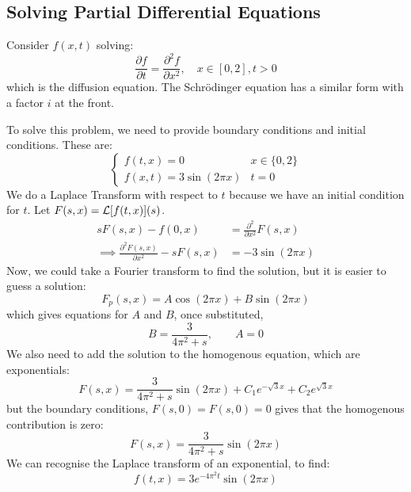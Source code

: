 \documentclass[../Main.tex]{subfiles}
\begin{document}
\subsection{Solving Partial Differential Equations}
\begin{example}
    Consider $f(x, t)$ solving:
    \begin{equation*}
        \frac{\partial f}{\partial t} = \frac{\partial^{2}f}{\partial x^{2}},\quad x \in [0, 2], t > 0
    \end{equation*}
    which is the diffusion equation. The Schr\"odinger equation has a similar form with a factor $i$ at the front.

    To solve this problem, we need to provide boundary conditions and initial conditions. These are:
    \begin{equation*}
        \begin{cases}
            f(t, x) = 0 & x \in \{0, 2\} \\
            f(x, t) = 3\sin(2\pi x) & t = 0
        \end{cases}
    \end{equation*}
    We do a Laplace Transform with respect to $t$ because we have an initial condition for $t$. Let $F(s, x) = \mathcal{L}[f(t, x)](s)$.
    \begin{align*}
        sF(s,x) - f(0,x) &= \frac{\partial^{2}}{\partial x^{2}}F(s,x) \\
        \implies \frac{\partial^{2}F(s,x)}{\partial x^{2}} - sF(s,x) &= -3\sin(2\pi x)
    \end{align*}
    Now, we could take a Fourier transform to find the solution, but it is easier to guess a solution:
    \begin{equation*}
        F_p(s,x) = A\cos(2\pi x) + B\sin(2\pi x)
    \end{equation*}
    which gives equations for $A$ and $B$, once substituted,
    \begin{equation*}
        B = \frac{3}{4\pi^2 + s},\qquad A = 0
    \end{equation*}
    We also need to add the solution to the homogenous equation, which are exponentials:
    \begin{equation*}
        F(s,x) = \frac{3}{4\pi^2 + s} \sin(2\pi x) + C_1 e^{-\sqrt{3}x} + C_2 e^{\sqrt{3}x}
    \end{equation*}
    but the boundary conditions, $F(s,0) = F(s,0) = 0$ gives that the homogenous contribution is zero:
    \begin{equation*}
        F(s,x) = \frac{3}{4\pi^2 + s}\sin(2\pi x)
    \end{equation*}
    We can recognise the Laplace transform of an exponential, to find:
    \begin{equation*}
        f(t,x) = 3e^{-4\pi^2 t} \sin(2\pi x)
    \end{equation*}
\end{example}
\end{document}
